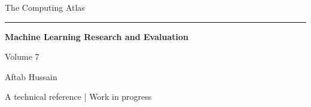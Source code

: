 \documentclass[11pt,oneside,openany]{book}
\begin{document}
\frontmatter
\begin{titlepage}
\centering
\vspace*{3.7cm}
{\Large The Computing Atlas\par}
\vspace{0.65cm}
\rule{0.6\textwidth}{0.5pt}\par
\vspace{0.75cm}
{\Huge\bfseries Machine Learning Research and Evaluation\par}
\vspace{1.0cm}
{\large Volume 7\par}
\vfill
{\large Aftab Hussain\par}
\vspace{0.6cm}
{\small A technical reference | Work in progress\par}
\vspace{1.2cm}
\end{titlepage}
\tableofcontents
\mainmatter

\end{document}
